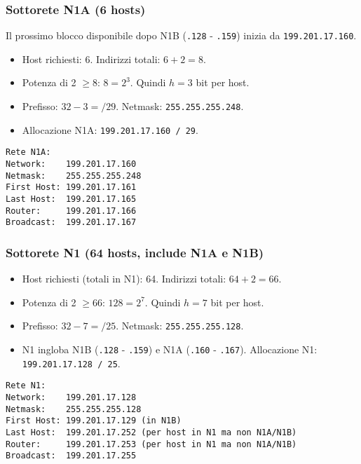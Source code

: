 \documentclass{article}
\begin{document}
\subsubsection{Sottorete N1A (6 hosts)}
Il prossimo blocco disponibile dopo N1B (\texttt{.128} - \texttt{.159}) inizia da \texttt{199.201.17.160}.
\begin{itemize}
    \item Host richiesti: 6. Indirizzi totali: $6 + 2 = 8$.
    \item Potenza di 2 $\geq 8$: $8 = 2^3$. Quindi $h=3$ bit per host.
    \item Prefisso: $32 - 3 = /29$. Netmask: \texttt{255.255.255.248}.
    \item Allocazione N1A: \texttt{199.201.17.160 / 29}.
\end{itemize}
\begin{verbatim}
Rete N1A:
Network:    199.201.17.160
Netmask:    255.255.255.248
First Host: 199.201.17.161
Last Host:  199.201.17.165
Router:     199.201.17.166
Broadcast:  199.201.17.167
\end{verbatim}

\subsubsection{Sottorete N1 (64 hosts, include N1A e N1B)}
\begin{itemize}
    \item Host richiesti (totali in N1): 64. Indirizzi totali: $64 + 2 = 66$.
    \item Potenza di 2 $\geq 66$: $128 = 2^7$. Quindi $h=7$ bit per host.
    \item Prefisso: $32 - 7 = /25$. Netmask: \texttt{255.255.255.128}.
    \item N1 ingloba N1B (\texttt{.128} - \texttt{.159}) e N1A (\texttt{.160} - \texttt{.167}). Allocazione N1: \texttt{199.201.17.128 / 25}.
\end{itemize}
\begin{verbatim}
Rete N1:
Network:    199.201.17.128
Netmask:    255.255.255.128
First Host: 199.201.17.129 (in N1B)
Last Host:  199.201.17.252 (per host in N1 ma non N1A/N1B)
Router:     199.201.17.253 (per host in N1 ma non N1A/N1B)
Broadcast:  199.201.17.255
\end{verbatim}
\end{document}
